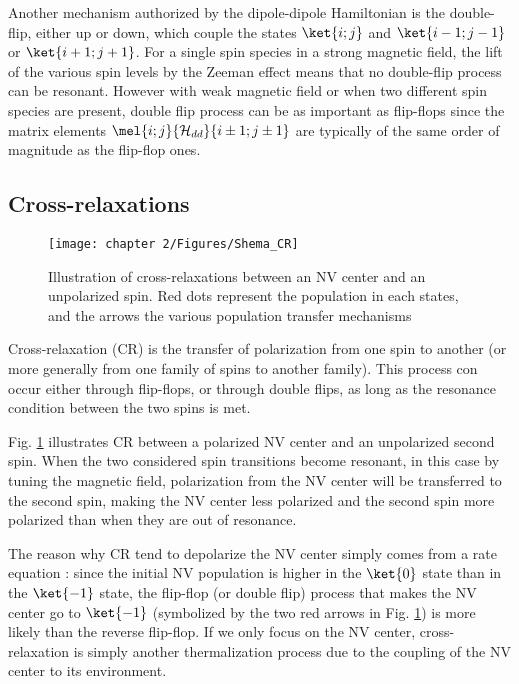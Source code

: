 \documentclass[a4paper,11pt]{report}
\begin{document}
\begin{refsection}
Another mechanism authorized by the dipole-dipole Hamiltonian is the double-flip, either up or down, which couple the states $\ket{i;j}$ and $\ket{i-1;j-1}$ or $\ket{i+1;j+1}$. For a single spin species in a strong magnetic field, the lift of the various spin levels by the Zeeman effect means that no double-flip process can be resonant. However with weak magnetic field or when two different spin species are present, double flip process can be as important as flip-flops since the matrix elements $\mel{i;j}{\mathcal{H}_{dd}}{i\pm 1;j \pm 1}$ are typically of the same order of magnitude as the flip-flop ones.

\subsection{Cross-relaxations}

\begin{figure}[h]
\centering
\texttt{[image: chapter 2/Figures/Shema\_CR]}
\caption{Illustration of cross-relaxations between an NV center and an unpolarized spin. Red dots represent the population in each states, and the arrows the various population transfer mechanisms}
\label{CR_shema}
\end{figure}

Cross-relaxation (CR) is the transfer of polarization from one spin to another (or more generally from one family of spins to another family). This process con occur either through flip-flops, or through double flips, as long as the resonance condition between the two spins is met. 

Fig. \ref{CR_shema} illustrates CR between a polarized NV center and an unpolarized second spin. When the two considered spin transitions become resonant, in this case by tuning the magnetic field, polarization from the NV center will be transferred to the second spin, making the NV center less polarized and the second spin more polarized than when they are out of resonance. 

The reason why CR tend to depolarize the NV center simply comes from a rate equation : since the initial NV population is higher in the $\ket{0}$ state than in the $\ket{-1}$ state, the flip-flop (or double flip) process that makes the NV center go to $\ket{-1}$ (symbolized by the two red arrows in Fig. \ref{CR_shema}) is more likely than the reverse flip-flop. If we only focus on the NV center, cross-relaxation is simply another thermalization process due to the coupling of the NV center to its environment.


\end{refsection}
\end{document}
